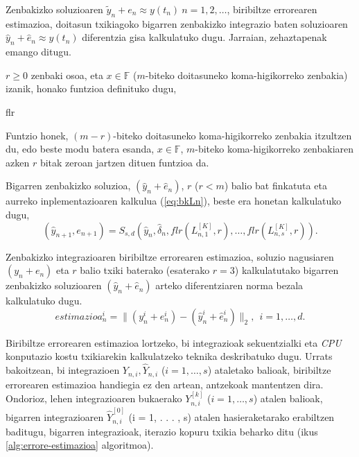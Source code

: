Zenbakizko soluzioaren $\tilde{y}_n+e_n \approx y(t_n) \ n=1,2,\dots$, biribiltze errorearen estimazioa, doitasun txikiagoko  bigarren zenbakizko integrazio baten soluzioaren $\hat{y}_n+\hat{e}_n \approx y(t_n)$ diferentzia gisa kalkulatuko dugu.  Jarraian, zehaztapenak emango ditugu.

$r\geqslant0$ zenbaki osoa, eta $x \in \mathbb{F}$ ($m$-biteko doitasuneko koma-higikorreko zenbakia) izanik, honako funtzioa definituko dugu,

\begin{algorithm}[H]
  \SetAlgoLined\DontPrintSemicolon
  \caption{flr}
\end{algorithm} 

Funtzio honek, $(m-r)$-biteko doitasuneko koma-higikorreko zenbakia itzultzen du, edo beste modu batera esanda, $x \in \mathbb{F}$, $m$-biteko koma-higikorreko zenbakiaren azken $r$ bitak zeroan jartzen dituen funtzioa da.

Bigarren zenbakizko soluzioa, $(\hat{y}_n+\hat{e}_{n})$, $r$ ($r<m$) balio bat finkatuta eta aurreko inplementazioaren kalkulua (\ref{eq:bkLn}), beste era honetan kalkulatuko dugu,
\begin{equation*}
\label{eq:bkLn2}
(\hat y_{n+1}, e_{n+1}) = S_{s,d}(\hat y_n, \hat{\delta}_n, flr(L_{n,1}^{[K]},r), \dots,flr(L_{n,s}^{[K]},r)).
\end{equation*}

Zenbakizko integrazioaren biribiltze errorearen estimazioa, soluzio nagusiaren $(y_n+e_{n})$ eta $r$  balio txiki baterako (esaterako $r=3$) kalkulatutako bigarren zenbakizko soluzioaren $(\hat{y}_n+\hat{e}_{n})$ arteko diferentziaren norma bezala kalkulatuko dugu. 
\begin{equation}
estimazioa_n^i=\|(y_n^i+e_n^i)-(\hat{y}_n^i+\hat{e}_{n}^i)\|_2, \ \ i=1,\dots,d.
\end{equation}

Biribiltze errorearen estimazioa lortzeko, bi integrazioak sekuentzialki eta \emph{CPU} konputazio kostu txikiarekin kalkulatzeko teknika deskribatuko dugu. Urrats bakoitzean, bi integrazioen $Y_{n,i},\hat{Y}_{n,i}$ ($i=1,\dots,s$) ataletako balioak, biribiltze errorearen estimazioa handiegia ez den artean, antzekoak mantentzen dira. Ondorioz, lehen integrazioaren bukaerako $Y_{n,i}^{[k]}$ ($i=1,\dots,s$) atalen balioak, bigarren integrazioaren $\hat{Y}_{n,i}^{[0]}$ (i = 1, . . . , s) atalen hasieraketarako erabiltzen baditugu, bigarren integrazioak, iterazio kopuru txikia beharko ditu (ikus \ref{alg:errore-estimazioa} algoritmoa).  


